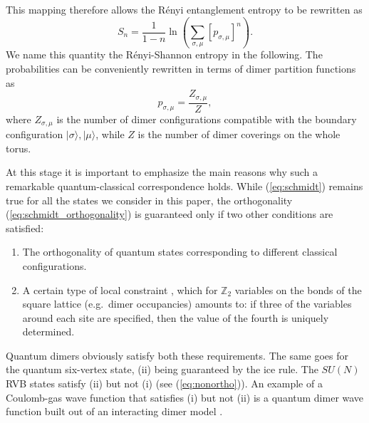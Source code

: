 \documentclass[11pt]{iopart}
\newcommand{\psm}{p_{\sigma,\mu}}
\begin{document}
This mapping therefore allows the R\'enyi entanglement entropy to be rewritten as
\begin{equation}
 S_n=\frac{1}{1-n}\ln \left(\sum_{\sigma,\mu}[\psm]^n\right).
 \label{Spsm}
\end{equation}
We name this quantity the R\'enyi-Shannon entropy in the following. The probabilities can be conveniently rewritten in terms of dimer partition functions as 
\begin{equation}
 \psm=\frac{Z_{\sigma,\mu}}{Z},
 \label{Zpsm}
\end{equation}
where $Z_{\sigma,\mu}$ is the number of dimer configurations compatible with the boundary configuration $|\sigma\rangle,|\mu\rangle$, while $Z$ is the number of dimer coverings on the whole torus. 

At this stage it is important to emphasize the main reasons why such a remarkable quantum-classical correspondence holds. While (\ref{eq:schmidt}) remains true for all the states we consider in this paper, the orthogonality (\ref{eq:schmidt_orthogonality}) is guaranteed only if two other conditions are satisfied:
\begin{enumerate}
 \item The orthogonality of quantum states corresponding to different classical configurations. 
 \item A certain type of local constraint \cite{Shannonee}, which for ${\mathbb Z}_2$ variables on the bonds of the square lattice (e.g.\ dimer occupancies) amounts to:  if three of the variables around each site are specified, then the value of the fourth is uniquely determined.  
\end{enumerate}
Quantum dimers obviously satisfy both these requirements. The same goes for the quantum six-vertex state, (ii) being guaranteed by the ice rule. The $SU(N)$ RVB states satisfy (ii) but not (i) (see (\ref{eq:nonortho})). An example of a Coulomb-gas wave function that satisfies (i) but not (ii) is a quantum dimer wave function built out of an interacting dimer model  \cite{Alet_dimers1,Alet_dimers2}. 
\end{document}
